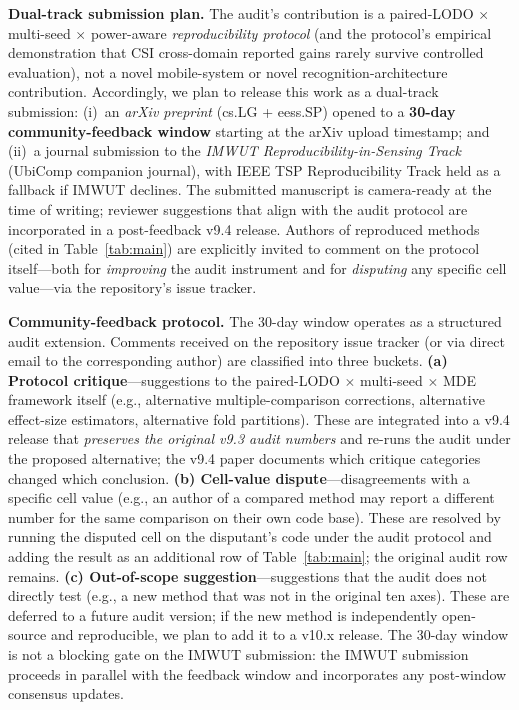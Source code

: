 \documentclass[11pt]{article}
\theoremstyle{definition}
\begin{document}
\textbf{Dual-track submission plan.} The audit's contribution is a paired-LODO $\times$ multi-seed $\times$ power-aware \emph{reproducibility protocol} (and the protocol's empirical demonstration that CSI cross-domain reported gains rarely survive controlled evaluation), not a novel mobile-system or novel recognition-architecture contribution. Accordingly, we plan to release this work as a dual-track submission: (i)~an \emph{arXiv preprint} (cs.LG + eess.SP) opened to a \textbf{30-day community-feedback window} starting at the arXiv upload timestamp; and (ii)~a journal submission to the \emph{IMWUT Reproducibility-in-Sensing Track} (UbiComp companion journal), with IEEE TSP Reproducibility Track held as a fallback if IMWUT declines. The submitted manuscript is camera-ready at the time of writing; reviewer suggestions that align with the audit protocol are incorporated in a post-feedback v9.4 release. Authors of reproduced methods (cited in Table~\ref{tab:main}) are explicitly invited to comment on the protocol itself---both for \emph{improving} the audit instrument and for \emph{disputing} any specific cell value---via the repository's issue tracker.

\textbf{Community-feedback protocol.} The 30-day window operates as a structured audit extension. Comments received on the repository issue tracker (or via direct email to the corresponding author) are classified into three buckets. \textbf{(a) Protocol critique}---suggestions to the paired-LODO $\times$ multi-seed $\times$ MDE framework itself (e.g., alternative multiple-comparison corrections, alternative effect-size estimators, alternative fold partitions). These are integrated into a v9.4 release that \emph{preserves the original v9.3 audit numbers} and re-runs the audit under the proposed alternative; the v9.4 paper documents which critique categories changed which conclusion. \textbf{(b) Cell-value dispute}---disagreements with a specific cell value (e.g., an author of a compared method may report a different number for the same comparison on their own code base). These are resolved by running the disputed cell on the disputant's code under the audit protocol and adding the result as an additional row of Table~\ref{tab:main}; the original audit row remains. \textbf{(c) Out-of-scope suggestion}---suggestions that the audit does not directly test (e.g., a new method that was not in the original ten axes). These are deferred to a future audit version; if the new method is independently open-source and reproducible, we plan to add it to a v10.x release. The 30-day window is not a blocking gate on the IMWUT submission: the IMWUT submission proceeds in parallel with the feedback window and incorporates any post-window consensus updates.
\end{document}
